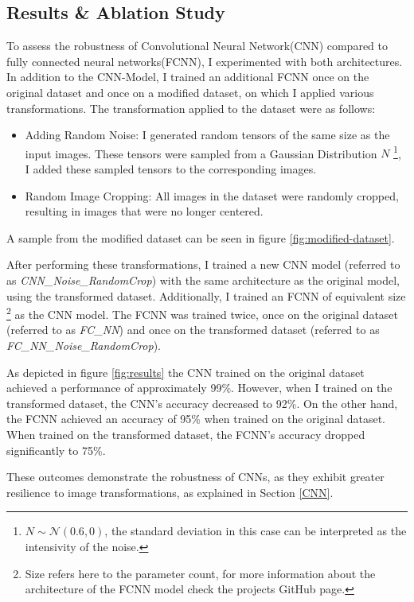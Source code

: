 \subsection{Results \& Ablation Study} \label{resultsAbalation}

To assess the robustness of Convolutional Neural Network(CNN) compared to fully connected neural networks(FCNN), I experimented with both architectures.
In addition to the CNN-Model, I trained an additional FCNN once on the original dataset and once on a modified dataset, on which I applied various transformations.
The transformation applied to the dataset were as follows:
\begin{itemize}
    \item  Adding Random Noise: I generated random tensors of the same size as the input images. These tensors were sampled from a Gaussian Distribution $N$  \footnote{$N \sim \mathcal{N}(0.6, 0)$, the standard deviation in this case can be interpreted as the intensivity of the noise.}, I added these sampled tensors to the corresponding images.
    \item Random Image Cropping: All images in the dataset were randomly cropped, resulting in images that were no longer centered.
\end{itemize}
A sample from the modified dataset can be seen in figure \ref{fig:modified-dataset}.

After performing these transformations, I trained a new CNN model (referred to as \textit{CNN\_Noise\_RandomCrop}) with the same architecture as the original model, using the transformed dataset.
Additionally, I trained an FCNN of equivalent size \footnote{Size refers here to the parameter count, for more information about the architecture of the FCNN model check the projects GitHub page.} as the CNN model.
The FCNN was trained twice, once on the original dataset (referred to as \textit{FC\_NN}) and once on the transformed dataset (referred to as \textit{FC\_NN\_Noise\_RandomCrop}).

As depicted in figure \ref{fig:results} the CNN trained on the original dataset achieved a performance of approximately 99\%.
However, when I trained on the transformed dataset, the CNN's accuracy decreased to 92\%.
On the other hand, the FCNN achieved an accuracy of 95\% when trained on the original dataset.
When trained on the transformed dataset, the FCNN's accuracy dropped significantly to 75\%.

These outcomes demonstrate the robustness of CNNs, as they exhibit greater resilience to image transformations, as explained in Section \ref{CNN}.

